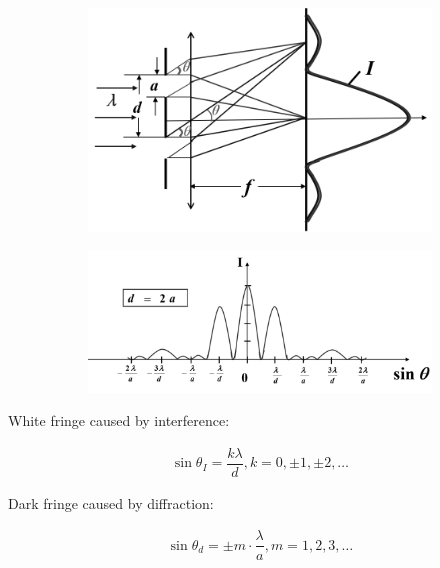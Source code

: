 \begin{figure}[H]
  \centering
  \begin{subfigure}{.35\textwidth}
    \centering
    \includegraphics[width=\linewidth]{figures/double-slit-diffraction.png}
  \end{subfigure}
  \begin{subfigure}{.6\textwidth}
    \centering
    \includegraphics[width=\linewidth]{figures/double-slit-diffraction-irradiance.png}
  \end{subfigure}
\end{figure}

White fringe caused by interference:

\begin{equation*}
  \begin{aligned}
    \sin \theta_I = \dfrac{k \lambda}{d}, k = 0,\pm 1, \pm 2, \dots
  \end{aligned}
\end{equation*}

Dark fringe caused by diffraction:

\begin{equation*}
  \begin{aligned}
    \sin \theta_d = \pm m \cdot \dfrac{\lambda}{a}, m = 1,2,3,\dots 
  \end{aligned}
\end{equation*}

